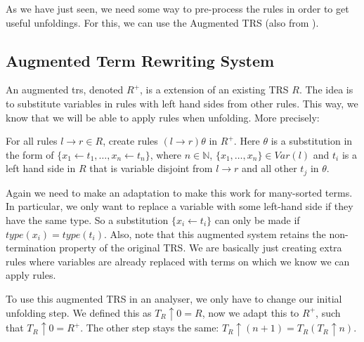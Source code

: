As we have just seen, we need some way to pre-process the rules in order to get useful unfoldings. For this, we can use the Augmented TRS (also from \cite{Payet:Unfolding}).  

\subsection*{Augmented Term Rewriting System}
An augmented trs, denoted $R^+$, is a extension of an existing TRS $R$. The idea is to substitute variables in rules with left hand sides from other rules. This way, we know that we will be able to apply rules when unfolding. More precisely:
\begin{definition}
For all rules $l \rightarrow r \in R$, create rules $(l \rightarrow r)\theta$ in $R^+$. Here $\theta$ is a substitution in the form of $\{ x_1 \leftarrow t_1, \dots, x_n \leftarrow t_n \}$, where $n \in \mathbb{N}$, $\{ x_1, \dots, x_n \} \in \textit{Var}(l)$ and $t_i$ is a left hand side in $R$ that is variable disjoint from $l \rightarrow r$ and all other $t_j$ in $\theta$. 
\end{definition}

Again we need to make an adaptation to make this work for many-sorted terms. In particular, we only want to replace a variable with some left-hand side if they have the same type. So a substitution $\{ x_i \leftarrow t_i \}$ can only be made if $\textit{type}(x_i) = \textit{type}(t_i)$. Also, note that this augmented system retains the non-termination property of the original TRS. We are basically just creating extra rules where variables are already replaced with terms on which we know we can apply rules.  

To use this augmented TRS in an analyser, we only have to change our initial unfolding step. We defined this as $T_R \uparrow 0 = R$, now we adapt this to $R^+$, such that $T_R \uparrow 0 = R^+$. The other step stays the same: $T_R \uparrow (n + 1) = T_R(T_R \uparrow n)$. 


